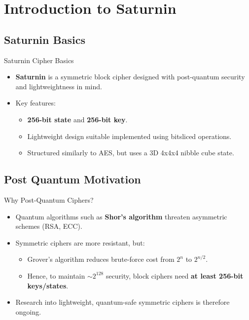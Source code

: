 \section{Introduction to Saturnin}
\subsection{Saturnin Basics}

\begin{frame}{Saturnin Cipher Basics}
\begin{itemize}
    \item \textbf{Saturnin} is a symmetric \alert{block cipher} designed with post-quantum security and lightweightness in mind.
    \item Key features:
    \begin{itemize}
        \item \textbf{256-bit state} and \textbf{256-bit key}.
        \item Lightweight design suitable implemented using bitsliced operations.
        \item Structured similarly to AES, but uses a 3D 4x4x4 \alert{nibble cube} state.
    \end{itemize}
    \end{itemize}

\end{frame}


\subsection{Post Quantum Motivation}
\begin{frame}{Why Post-Quantum Ciphers?}
\begin{itemize}
    \item Quantum algorithms such as \textbf{Shor's algorithm} threaten asymmetric schemes (RSA, ECC).
    \item Symmetric ciphers are more resistant, but:
    \begin{itemize}
        \item Grover's algorithm reduces brute-force cost from $2^n$ to $2^{n/2}$.
        \item Hence, to maintain $\sim 2^{128}$ security, block ciphers need \textbf{at least 256-bit keys/states}.
    \end{itemize}
    \item Research into \alert{lightweight, quantum-safe symmetric ciphers} is therefore ongoing.
\end{itemize}
\end{frame}

